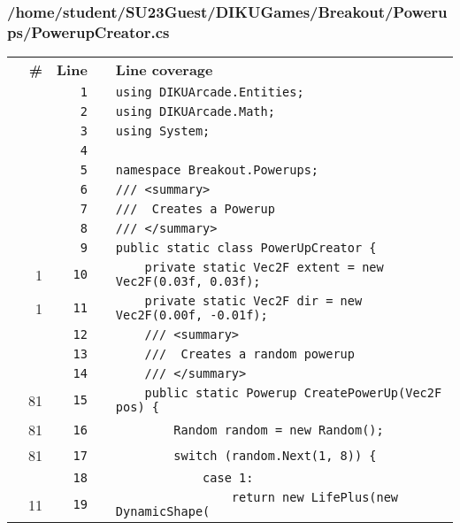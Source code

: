 \documentclass[a4paper,landscape,10pt]{article}
\begin{document}
\subsubsection{/home/student/SU23Guest/DIKUGames/Breakout/Powerups/PowerupCreator.cs}
\begin{longtable}[l]{lrrll}
\textbf{} & \textbf{\#} & \textbf{Line} & \textbf{} & \textbf{Line coverage}\\
\cellcolor{gray} &  & \verb~1~ & & \verb~using DIKUArcade.Entities;~\\
\cellcolor{gray} &  & \verb~2~ & & \verb~using DIKUArcade.Math;~\\
\cellcolor{gray} &  & \verb~3~ & & \verb~using System;~\\
\cellcolor{gray} &  & \verb~4~ & & \verb~~\\
\cellcolor{gray} &  & \verb~5~ & & \verb~namespace Breakout.Powerups;~\\
\cellcolor{gray} &  & \verb~6~ & & \verb~/// <summary>~\\
\cellcolor{gray} &  & \verb~7~ & & \verb~///  Creates a Powerup~\\
\cellcolor{gray} &  & \verb~8~ & & \verb~/// </summary>~\\
\cellcolor{gray} &  & \verb~9~ & & \verb~public static class PowerUpCreator {~\\
\cellcolor{green} & 1 & \verb~10~ & & \verb~    private static Vec2F extent = new Vec2F(0.03f, 0.03f);~\\
\cellcolor{green} & 1 & \verb~11~ & & \verb~    private static Vec2F dir = new Vec2F(0.00f, -0.01f);~\\
\cellcolor{gray} &  & \verb~12~ & & \verb~    /// <summary>~\\
\cellcolor{gray} &  & \verb~13~ & & \verb~    ///  Creates a random powerup~\\
\cellcolor{gray} &  & \verb~14~ & & \verb~    /// </summary>~\\
\cellcolor{green} & 81 & \verb~15~ & & \verb~    public static Powerup CreatePowerUp(Vec2F pos) {~\\
\cellcolor{green} & 81 & \verb~16~ & & \verb~        Random random = new Random();~\\
\cellcolor{green} & 81 & \verb~17~ & & \verb~        switch (random.Next(1, 8)) {~\\
\cellcolor{gray} &  & \verb~18~ & & \verb~            case 1:~\\
\cellcolor{green} & 11 & \verb~19~ & & \verb~                return new LifePlus(new DynamicShape(~\\

\end{longtable}
\end{document}
